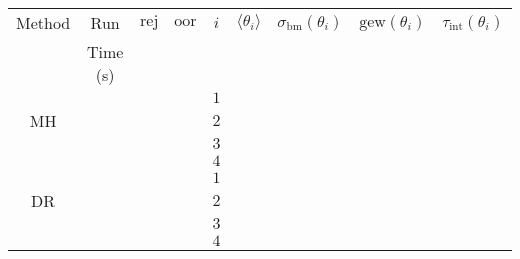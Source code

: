 \begin{table}[h!]
\begin{center}
\begin{tabular}{|c|c|c|c|c|c|c|c|c|}
\hline
Method & Run      & $\text{rej}$           & $\text{oor}$           & $i$ & $\langle\theta_i\rangle$ & $\sigma_{\text{bm}}(\theta_i)$ & $\text{gew}(\theta_i)$ & $\tau_{\text{int}}(\theta_i)$ \\
       & Time (s) &                        &                        &     &                          &                                &                        &                               \\
\hline
\hline
       &          &                        &                        & $1$ &                          &                                &                        &                               \\
\cline{5-9}
MH     &          &                        &                        & $2$ &                          &                                &                        &                               \\
\cline{5-9}
       &          &                        &                        & $3$ &                          &                                &                        &                               \\
\cline{5-9}
       &          &                        &                        & $4$ &                          &                                &                        &                               \\
\hline
\hline
       &          &                        &                        & $1$ &                          &                                &                        &                               \\
\cline{5-9}
DR     &          &                        &                        & $2$ &                          &                                &                        &                               \\
\cline{5-9}
       &          &                        &                        & $3$ &                          &                                &                        &                               \\
\cline{5-9}
       &          &                        &                        & $4$ &                          &                                &                        &                               \\

\end{tabular}
\end{center}
\end{table}
